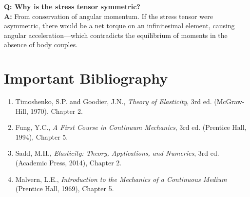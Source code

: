 \textbf{Q: Why is the stress tensor symmetric?}\\
\textbf{A:} From conservation of angular momentum. If the stress tensor were asymmetric, there would be a net torque on an infinitesimal element, causing angular acceleration---which contradicts the equilibrium of moments in the absence of body couples.
\section*{Important Bibliography}

\begin{enumerate}
\item Timoshenko, S.P. and Goodier, J.N., \textit{Theory of Elasticity}, 3rd ed. (McGraw-Hill, 1970), Chapter 2.
\item Fung, Y.C., \textit{A First Course in Continuum Mechanics}, 3rd ed. (Prentice Hall, 1994), Chapter 5.
\item Sadd, M.H., \textit{Elasticity: Theory, Applications, and Numerics}, 3rd ed. (Academic Press, 2014), Chapter 2.
\item Malvern, L.E., \textit{Introduction to the Mechanics of a Continuous Medium} (Prentice Hall, 1969), Chapter 5.
\end{enumerate}

